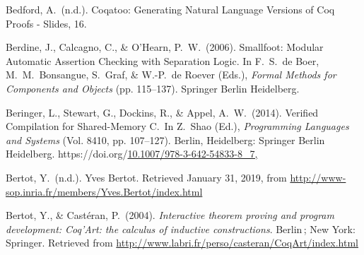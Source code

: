 \documentclass[12pt,twoside]{article}
\begin{document}
{\begin{thebibliography}{222}
\mdbibitemlabel{}Bedford, A.~(n.d.). Coqatoo: Generating Natural Language Versions of Coq Proofs - Slides, 16.\label{bedford_coqatoo:_nodate}%

\mdbibitemlabel{}Berdine, J., Calcagno, C., \& O’Hearn, P.~W.~(2006). Smallfoot: Modular Automatic Assertion Checking with Separation Logic. In F.~S.~de Boer, M.~M.~Bonsangue, S.~Graf, \& W.-P.~de Roever (Eds.), \emph{Formal Methods for Components and Objects} (pp. 115–137). Springer Berlin Heidelberg.\label{berdine_smallfoot:_2006}%

\mdbibitemlabel{}Beringer, L., Stewart, G., Dockins, R., \& Appel, A.~W.~(2014). Verified Compilation for Shared-Memory C.~In Z.~Shao (Ed.), \emph{Programming Languages and Systems} (Vol. 8410, pp. 107–127). Berlin, Heidelberg: Springer Berlin Heidelberg. https://doi.org/\href{https://dx.doi.org/10.1007/978-3-642-54833-8_7,}{10.1007/978-3-642-54833-8\_7,}\label{hutchison_verified_2014}%

\mdbibitemlabel{}Bertot, Y.~(n.d.). Yves Bertot. Retrieved January 31, 2019, from \href{http://www-sop.inria.fr/members/Yves.Bertot/index.html}{{\ttfamily http://\hspace{0pt}www-\hspace{0pt}sop.\hspace{0pt}inria.\hspace{0pt}fr/\hspace{0pt}members/\hspace{0pt}Yves.\hspace{0pt}Bertot/\hspace{0pt}index.\hspace{0pt}html}}\label{bertot_yves_nodate}%

\mdbibitemlabel{}Bertot, Y., \& Castéran, P.~(2004). \emph{Interactive theorem proving and program development: Coq’Art: the calculus of inductive constructions}. Berlin ; New York: Springer. Retrieved from \href{http://www.labri.fr/perso/casteran/CoqArt/index.html}{{\ttfamily http://\hspace{0pt}www.\hspace{0pt}labri.\hspace{0pt}fr/\hspace{0pt}perso/\hspace{0pt}casteran/\hspace{0pt}CoqArt/\hspace{0pt}index.\hspace{0pt}html}}\label{bertot_interactive_2004}%


\end{thebibliography}}
\end{document}
